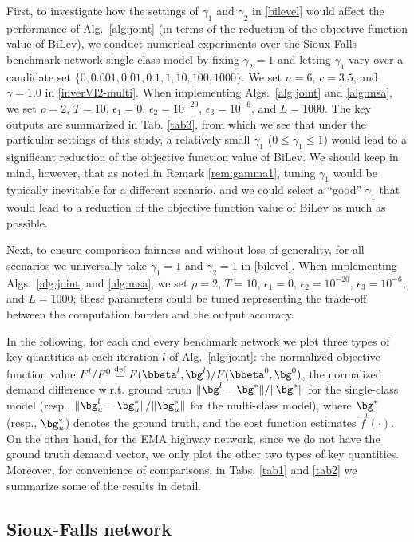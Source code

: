 \documentclass[3p]{elsarticle}
\newcommand*{\defeq}{\stackrel{\text{def}}{=}}
\begin{document}
First, to investigate how the settings of $\gamma_1$ and $\gamma_2$ in
\eqref{bilevel} would affect the performance of Alg.~\ref{alg:joint} (in
terms of the reduction of the objective function value of BiLev), we
conduct numerical experiments over the Sioux-Falls benchmark network
single-class model by fixing $\gamma_2 = 1$ and letting $\gamma_1$ vary
over a candidate set $\{0, 0.001, 0.01, 0.1, 1, 10, 100, 1000\}$.  We
set $n=6$, $c = 3.5$, and $\gamma = 1.0$ in
\eqref{inverVI2-multi}. When implementing Algs.~\ref{alg:joint} and
\ref{alg:msa}, we set $\rho = 2$, $T = 10$, $\epsilon_1 =0$, $\epsilon_2
= 10^{-20}$, $\epsilon_3 = 10^{-6}$, and $L = 1000$. The key outputs are
summarized in Tab. \ref{tab3}, from which we see that under the
particular settings of this study, a relatively small $\gamma_1$ ($0 \le
\gamma_1 \le 1$) would lead to a significant reduction of the objective
function value of BiLev. We should keep in mind, however, that as noted
in Remark \ref{rem:gamma1}, tuning $\gamma_1$ would be typically
inevitable for a different scenario, and we could select a ``good''
$\gamma_1$ that would lead to a reduction of the objective function
value of BiLev as much as possible.


Next, to ensure comparison fairness and without loss of generality, for
all scenarios we universally take $\gamma_1 = 1$ and $\gamma_2=1$ in
\eqref{bilevel}. When implementing Algs.~\ref{alg:joint} and
\ref{alg:msa}, we set $\rho = 2$, $T = 10$, $\epsilon_1 =0$, $\epsilon_2
= 10^{-20}$, $\epsilon_3 = 10^{-6}$, and $L = 1000$; these parameters
could be tuned representing the trade-off between the computation burden
and the output accuracy.

In the following, for each and every benchmark network we plot three
types of key quantities at each iteration $l$ of Alg.~\ref{alg:joint}:
the normalized objective function value $F^l/F^0 \defeq
F(\bbeta^l,\bg^l)/F(\bbeta^0,\bg^0)$, the normalized demand difference
w.r.t. ground truth $\|\bg^l-\bg^*\|/\|\bg^*\|$ for the single-class
model (resp., $\|\bg_u^l-\bg_u^*\|/\|\bg_u^*\|$ for the multi-class
model), where $ \bg^*$ (resp., $\bg_u^*$) denotes the ground truth, and
the cost function estimates $\hat f^l(\cdot)$. On the other hand, for
the EMA highway network, since we do not have the ground truth demand
vector, we only plot the other two types of key quantities. Moreover,
for convenience of comparisons, in Tabs. \ref{tab1} and \ref{tab2} we
summarize some of the results in detail.

\subsection{Sioux-Falls network}
\end{document}
